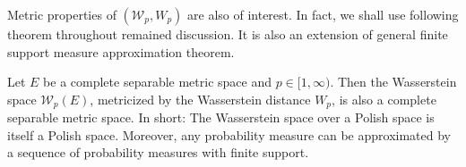 Metric properties of $(\mathcal{W}_p, W_p)$ are also of interest.
In fact, we shall use following theorem \cite[Theorem 6.18]{villani2008optimal} throughout remained discussion.
It is also an extension of general finite support measure approximation theorem.
\begin{thm}
	\label{thm:topology_Wasserstein}
	Let \( E \) be a complete separable metric space and \( p \in [ 1 , \infty ) \).
	Then the Wasserstein space \( \mathcal{W}_p(E) \),
	metricized by the Wasserstein distance \( W _ { p }\),
	is also a complete separable metric space.
	In short: The Wasserstein space over a Polish space is itself a Polish space.
	Moreover, any probability measure can be approximated by a sequence of probability measures with finite support.
\end{thm}
